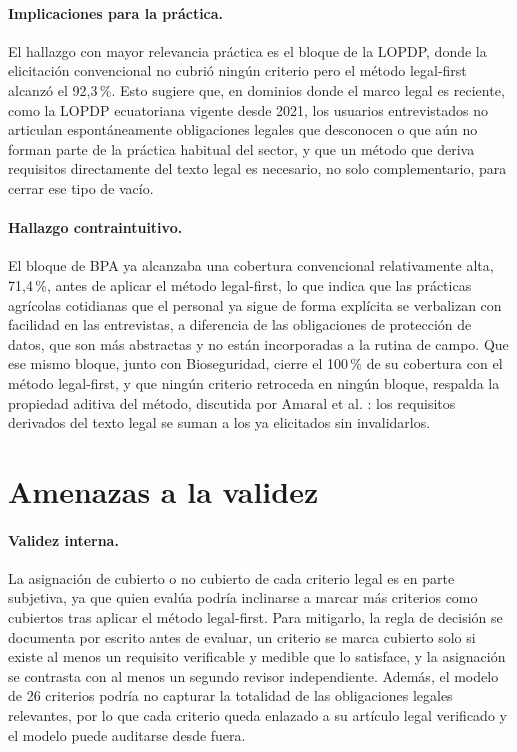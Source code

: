 \documentclass[pdflatex,sn-mathphys-num]{sn-jnl}
\begin{document}
\paragraph{Implicaciones para la pr\'actica.} El hallazgo con mayor relevancia pr\'actica es el bloque de la LOPDP, donde la elicitaci\'on convencional no cubri\'o ning\'un criterio pero el m\'etodo legal-first alcanz\'o el 92,3\,\%. Esto sugiere que, en dominios donde el marco legal es reciente, como la LOPDP ecuatoriana vigente desde 2021, los usuarios entrevistados no articulan espont\'aneamente obligaciones legales que desconocen o que a\'un no forman parte de la pr\'actica habitual del sector, y que un m\'etodo que deriva requisitos directamente del texto legal es necesario, no solo complementario, para cerrar ese tipo de vac\'io.

\paragraph{Hallazgo contraintuitivo.} El bloque de BPA ya alcanzaba una cobertura convencional relativamente alta, 71,4\,\%, antes de aplicar el m\'etodo legal-first, lo que indica que las pr\'acticas agr\'icolas cotidianas que el personal ya sigue de forma expl\'icita se verbalizan con facilidad en las entrevistas, a diferencia de las obligaciones de protecci\'on de datos, que son m\'as abstractas y no est\'an incorporadas a la rutina de campo. Que ese mismo bloque, junto con Bioseguridad, cierre el 100\,\% de su cobertura con el m\'etodo legal-first, y que ning\'un criterio retroceda en ning\'un bloque, respalda la propiedad aditiva del m\'etodo, discutida por Amaral et al. \cite{amaral2021}: los requisitos derivados del texto legal se suman a los ya elicitados sin invalidarlos.

\section{Amenazas a la validez}\label{sec:amenazas}

\paragraph{Validez interna.} La asignaci\'on de cubierto o no cubierto de cada criterio legal es en parte subjetiva, ya que quien eval\'ua podr\'ia inclinarse a marcar m\'as criterios como cubiertos tras aplicar el m\'etodo legal-first. Para mitigarlo, la regla de decisi\'on se documenta por escrito antes de evaluar, un criterio se marca cubierto solo si existe al menos un requisito verificable y medible que lo satisface, y la asignaci\'on se contrasta con al menos un segundo revisor independiente. Adem\'as, el modelo de 26 criterios podr\'ia no capturar la totalidad de las obligaciones legales relevantes, por lo que cada criterio queda enlazado a su art\'iculo legal verificado y el modelo puede auditarse desde fuera.
\end{document}
